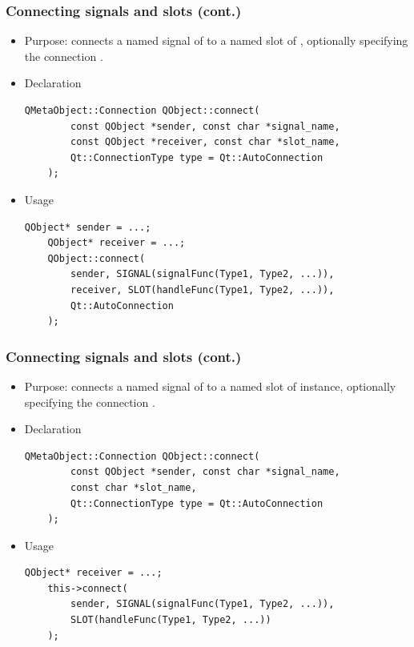 \begin{frame}[fragile]
  \frametitle{Connecting signals and slots (cont.)}
   \begin{itemize}
      \item Purpose: connects a named signal of \verb@sender@ to a named slot
        of \verb@receiver@, optionally specifying the connection \verb@type@.
      \item Declaration
      \begin{lstlisting}[basicstyle=\scriptsize\ttfamily]
	QMetaObject::Connection QObject::connect(
	    const QObject *sender, const char *signal_name,
	    const QObject *receiver, const char *slot_name,
	    Qt::ConnectionType type = Qt::AutoConnection
	);
      \end{lstlisting}
      \item Usage
      \begin{lstlisting}[basicstyle=\scriptsize\ttfamily]
	QObject* sender = ...;
	QObject* receiver = ...;
	QObject::connect(
	    sender, SIGNAL(signalFunc(Type1, Type2, ...)),
	    receiver, SLOT(handleFunc(Type1, Type2, ...)),
	    Qt::AutoConnection
	);
      \end{lstlisting}
    \end{itemize}
\end{frame}

\begin{frame}[fragile]
  \frametitle{Connecting signals and slots (cont.)}
   \begin{itemize}
      \item Purpose: connects a named signal of \verb@sender@ to a named slot
        of \verb@this@ instance, optionally specifying the connection \verb@type@.
      \item Declaration
      \begin{lstlisting}[basicstyle=\scriptsize\ttfamily]
	QMetaObject::Connection QObject::connect(
	    const QObject *sender, const char *signal_name,
	    const char *slot_name,
	    Qt::ConnectionType type = Qt::AutoConnection
	);
      \end{lstlisting}
      \item Usage
      \begin{lstlisting}[basicstyle=\scriptsize\ttfamily]
	QObject* receiver = ...;
	this->connect(
	    sender, SIGNAL(signalFunc(Type1, Type2, ...)),
	    SLOT(handleFunc(Type1, Type2, ...))
	);
      \end{lstlisting}
    \end{itemize}
\end{frame}

